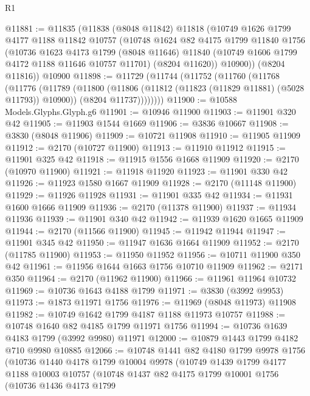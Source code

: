 \begin{lexlean}{R1}
\begin{coremodule}
@11881 := @11835
    (@11838
      (@8048 @11842)
      @11818
      (@10749
        @1626
        @1799
        @4177
        @1188
        @11842
        @10757
        (@10748
          @1624
          @82
          @4175
          @1799
          @11840
          @1756
          (@10736
            @1623
            @4173
            @1799
            (@8048 @11646)
            @11840
            (@10749 @1606 @1799 @4172 @1188 @11646 @10757 @11701)
            (@8204 @11620))
          @10900))
      (@8204 @11816))
    @10900
@11898 := @11729
    (@11744
      (@11752
        (@11760
          (@11768
            (@11776
              (@11789
                (@11800
                  (@11806 (@11812 (@11823 (@11829 @11881) (@5028 @11793)) @10900))
                  (@8204 @11737))))))))
@11900 := @10588 Models.Glyphs.Glyph.g6
@11901 := @10946 @11900
@11903 := @11901 @320 @42
@11905 := @11903 @1544 @1669
@11906 := @3836 @10667
@11908 := @3830 (@8048 @11906)
@11909 := @10721 @11908
@11910 := @11905 @11909
@11912 := @2170 (@10727 @11900)
@11913 := @11910 @11912
@11915 := @11901 @325 @42
@11918 := @11915 @1556 @1668 @11909
@11920 := @2170 (@10970 @11900)
@11921 := @11918 @11920
@11923 := @11901 @330 @42
@11926 := @11923 @1580 @1667 @11909
@11928 := @2170 (@11148 @11900)
@11929 := @11926 @11928
@11931 := @11901 @335 @42
@11934 := @11931 @1600 @1666 @11909
@11936 := @2170 (@11378 @11900)
@11937 := @11934 @11936
@11939 := @11901 @340 @42
@11942 := @11939 @1620 @1665 @11909
@11944 := @2170 (@11566 @11900)
@11945 := @11942 @11944
@11947 := @11901 @345 @42
@11950 := @11947 @1636 @1664 @11909
@11952 := @2170 (@11785 @11900)
@11953 := @11950 @11952
@11956 := @10711 @11900 @350 @42
@11961 := @11956 @1644 @1663 @1756 @10710 @11909
@11962 := @2171 @350
@11964 := @2170 (@11962 @11900)
@11966 := @11961 @11964 @10732
@11969 := @10736 @1643 @4188 @1799
@11971 := @3830 (@3992 @9953)
@11973 := @1873 @11971 @1756
@11976 := @11969 (@8048 @11973) @11908
@11982 := @10749 @1642 @1799 @4187 @1188 @11973 @10757
@11988 := @10748 @1640 @82 @4185 @1799 @11971 @1756
@11994 := @10736 @1639 @4183 @1799 (@3992 @9980) @11971
@12000 := @10879 @1443 @1799 @4182 @710 @9980 @10885
@12066 := @10748
    @1441
    @82
    @4180
    @1799
    @9978
    @1756
    (@10736
      @1440
      @4178
      @1799
      @10004
      @9978
      (@10749
        @1439
        @1799
        @4177
        @1188
        @10003
        @10757
        (@10748
          @1437
          @82
          @4175
          @1799
          @10001
          @1756
          (@10736
            @1436
            @4173
            @1799

\end{coremodule}
\end{lexlean}
